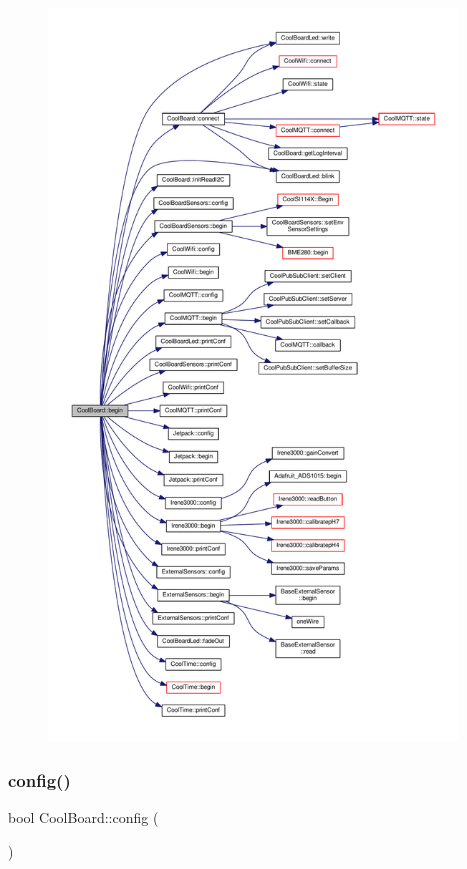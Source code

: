 \begin{figure}[H]
\begin{center}
\leavevmode
\includegraphics[height=550pt]{d7/df9/class_cool_board_acba7c5aef7268b2c0044bdb54d3b9d76_cgraph}
\end{center}
\end{figure}
\mbox{\label{class_cool_board_a583a874c09c07e70a6eb9229fc4beddb}} 
\subsubsection{\texorpdfstring{config()}{config()}}
{\footnotesize\ttfamily bool Cool\+Board\+::config (\begin{DoxyParamCaption}{ }\end{DoxyParamCaption})}

